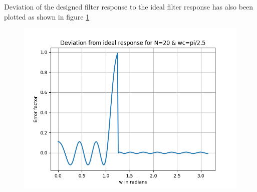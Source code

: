 \documentclass[conference]{IEEEtran}
\begin{document}
\begin{enumerate}[label=(\alph*)]
Deviation of the designed filter response to the ideal filter response has also been plotted as shown in figure \ref{fig:dev1}
\begin{figure}[!h]
	\begin{center} 
	    \includegraphics[width=0.7\columnwidth]{figs/dev/dev1}
	\end{center}
\caption{}
\label{fig:dev1}
\end{figure}



\end{enumerate}
\end{document}
